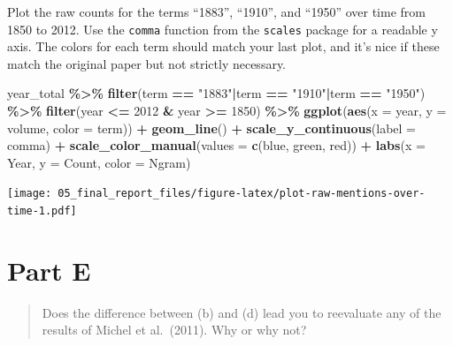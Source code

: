 \documentclass[
]{article}
\newenvironment{Shaded}{\begin{snugshade}}{\end{snugshade}}
\newcommand{\AttributeTok}[1]{\textcolor[rgb]{0.13,0.29,0.53}{#1}}
\newcommand{\DecValTok}[1]{\textcolor[rgb]{0.00,0.00,0.81}{#1}}
\newcommand{\FunctionTok}[1]{\textcolor[rgb]{0.13,0.29,0.53}{\textbf{#1}}}
\newcommand{\NormalTok}[1]{#1}
\newcommand{\SpecialCharTok}[1]{\textcolor[rgb]{0.81,0.36,0.00}{\textbf{#1}}}
\newcommand{\StringTok}[1]{\textcolor[rgb]{0.31,0.60,0.02}{#1}}
\begin{document}
Plot the raw counts for the terms ``1883'', ``1910'', and ``1950'' over
time from 1850 to 2012. Use the \texttt{comma} function from the
\texttt{scales} package for a readable y axis. The colors for each term
should match your last plot, and it's nice if these match the original
paper but not strictly necessary.

\begin{Shaded}
\begin{Highlighting}[]
\NormalTok{year\_total }\SpecialCharTok{\%\textgreater{}\%}
  \FunctionTok{filter}\NormalTok{(term }\SpecialCharTok{==} \StringTok{"1883"}\SpecialCharTok{|}\NormalTok{term }\SpecialCharTok{==} \StringTok{"1910"}\SpecialCharTok{|}\NormalTok{term }\SpecialCharTok{==} \StringTok{"1950"}\NormalTok{) }\SpecialCharTok{\%\textgreater{}\%} 
  \FunctionTok{filter}\NormalTok{(year }\SpecialCharTok{\textless{}=} \DecValTok{2012} \SpecialCharTok{\&}\NormalTok{ year }\SpecialCharTok{\textgreater{}=} \DecValTok{1850}\NormalTok{) }\SpecialCharTok{\%\textgreater{}\%} 
  \FunctionTok{ggplot}\NormalTok{(}\FunctionTok{aes}\NormalTok{(}\AttributeTok{x =}\NormalTok{ year, }\AttributeTok{y =}\NormalTok{ volume, }\AttributeTok{color =}\NormalTok{ term)) }\SpecialCharTok{+}
  \FunctionTok{geom\_line}\NormalTok{() }\SpecialCharTok{+}
  \FunctionTok{scale\_y\_continuous}\NormalTok{(}\AttributeTok{label =}\NormalTok{ comma) }\SpecialCharTok{+}
  \FunctionTok{scale\_color\_manual}\NormalTok{(}\AttributeTok{values =} \FunctionTok{c}\NormalTok{(}\StringTok{\textquotesingle{}blue\textquotesingle{}}\NormalTok{, }\StringTok{\textquotesingle{}green\textquotesingle{}}\NormalTok{, }\StringTok{\textquotesingle{}red\textquotesingle{}}\NormalTok{)) }\SpecialCharTok{+}
  \FunctionTok{labs}\NormalTok{(}\AttributeTok{x =} \StringTok{\textquotesingle{}Year\textquotesingle{}}\NormalTok{, }\AttributeTok{y =} \StringTok{\textquotesingle{}Count\textquotesingle{}}\NormalTok{, }\AttributeTok{color =} \StringTok{\textquotesingle{}Ngram\textquotesingle{}}\NormalTok{)}
\end{Highlighting}
\end{Shaded}

\texttt{[image: 05\_final\_report\_files/figure-latex/plot-raw-mentions-over-time-1.pdf]}

\hypertarget{part-e}{%
\section{Part E}\label{part-e}}

\begin{quote}
Does the difference between (b) and (d) lead you to reevaluate any of
the results of Michel et al.~(2011). Why or why not?
\end{quote}
\end{document}
